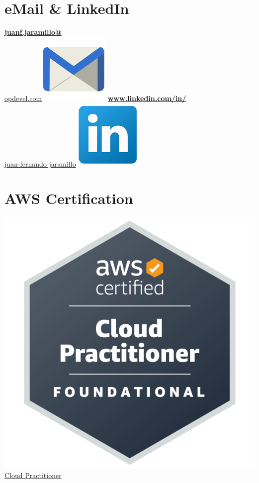 \begin{aside}
    \section{eMail \& LinkedIn}
    \href{mailto:juanf.jaramillo@opdevel.com}{\small{\textbf{juanf.jaramillo@}\\opdevel.com}\includegraphics[scale=0.07]{img/email2.png}}
    \href{https://www.linkedin.com/in/juan-fernando-jaramillo/}{\textbf{www.linkedin.com/in/}\small{\\juan-fernando-jaramillo}\includegraphics[scale=0.07]{img/Linkedin.png}}
   ~
   ~
    \section{AWS Certification}
    \href{https://www.credly.com/badges/2a62b468-b67f-47cc-b7a6-8a8da5de9c4d/public_url}{\includegraphics[scale=0.02]{img/aws-certified-cloud-practitioner.png}Cloud Practitioner}
   ~
   ~
   ~
   ~
   ~

\end{aside}
